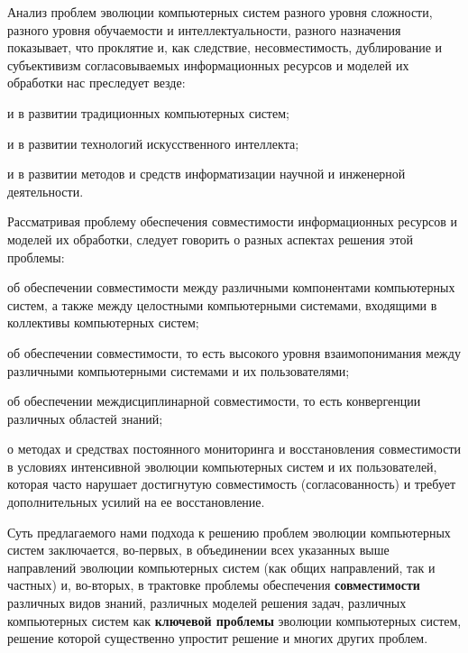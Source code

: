 Анализ проблем эволюции компьютерных систем разного уровня сложности, разного уровня обучаемости и интеллектуальности, разного назначения показывает, что проклятие  и, как следствие, несовместимость, дублирование и субъективизм согласовываемых информационных ресурсов и моделей их обработки нас преследует везде:
\begin{textitemize}
	\item и в развитии традиционных компьютерных систем;
	\item и в развитии технологий искусственного интеллекта;
	\item и в развитии методов и средств информатизации научной и инженерной деятельности.
\end{textitemize}

Рассматривая проблему обеспечения совместимости информационных ресурсов и моделей их обработки, следует говорить о разных аспектах решения этой проблемы:
\begin{textitemize}
	\item об обеспечении совместимости между различными компонентами компьютерных систем, а также между целостными компьютерными системами, входящими в коллективы компьютерных систем;
	\item об обеспечении совместимости, то есть высокого уровня взаимопонимания между различными компьютерными системами и их пользователями;
	\item об обеспечении междисциплинарной совместимости, то есть конвергенции различных областей знаний;
	\item о методах и средствах постоянного мониторинга и восстановления совместимости в условиях интенсивной эволюции компьютерных систем и их пользователей, которая часто нарушает достигнутую совместимость (согласованность) и требует дополнительных усилий на ее восстановление.
\end{textitemize}

Суть предлагаемого нами подхода к решению проблем эволюции компьютерных систем заключается, во-первых, в объединении всех указанных выше направлений эволюции компьютерных систем (как общих направлений, так и частных) и, во-вторых, в трактовке проблемы обеспечения \textbf{совместимости} различных видов знаний, различных моделей решения задач, различных компьютерных систем как \textbf{ключевой проблемы} эволюции компьютерных систем, решение которой существенно упростит решение и многих других проблем.


